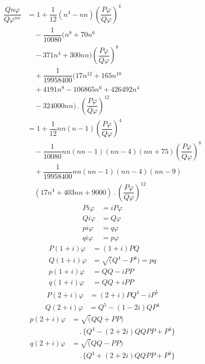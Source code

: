 \[
\begin{aligned}
\dfrac{Qn\varphi}{Q\varphi^{nn}}
&=1+\dfrac1{12}(n^4-nn)\left(\dfrac{P\varphi}{Q\varphi}\right)^4
\\[5pt]&\quad{}-\dfrac1{10080}(n^8+70n^6\\[5pt]&\quad{}-371n^4+300nn)\left(\dfrac{P\varphi}{Q\varphi}\right)^8\\[7pt]
&\quad+\dfrac1{19958400}(17n^{12}+165n^{10}\\[5pt]&\quad{}+4191n^8-106865n^6+426492n^4\\[7pt]
&\quad-324000nn)\, .\,\left(\dfrac{P\varphi}{Q\varphi}\right)^{12}\\[7pt]
&=1+\dfrac1{12}nn(n-1)\left(\dfrac{P\varphi}{Q\varphi}\right)^4
\\[5pt]&\quad{}-\dfrac1{10080}nn(nn-1)(nn-4)(nn+75)\left(\dfrac{P\varphi}{Q\varphi}\right)^8\\[7pt]
&\quad+\dfrac1{19958400}nn(nn-1)(nn-4)(nn-9)\\[5pt]&\quad{}(17n^4+403nn+9000)\, .\,\left(\dfrac{P\varphi}{Q\varphi}\right)^{12}
\end{aligned}
\]
\[
\begin{aligned}
Pi\varphi&=iP\varphi\\[4pt]
Qi\varphi&=Q\varphi\\[4pt]
pi\varphi&=q\varphi\\[4pt]
qi\varphi&=p\varphi
\end{aligned}
\]
\[
\begin{aligned}
P(1+i)\varphi&=(1+i)PQ\\[4pt]
Q(1+i)\varphi&=\surd(Q^4-P^4)=pq\\[4pt]
p(1+i)\varphi&=QQ-iPP\\[4pt]
q(1+i)\varphi&=QQ+iPP
\end{aligned}
\]
\[
\begin{aligned}P(2+i)\varphi&=(2+i)PQ^4-iP^5\end{aligned}
\]
\[
\begin{aligned}Q(2+i)\varphi&=Q^5-(1-2i)QP^4\end{aligned}
\]
\[
\begin{aligned}p(2+i)\varphi&=\surd(QQ+PP)\\[5pt]&\quad{}\, .\,\{Q^4-(2+2i)QQPP+P^4\}\end{aligned}
\]
\[
\begin{aligned}q(2+i)\varphi&=\surd(QQ-PP)\\[5pt]&\quad{}\, .\,\{Q^4+(2+2i)QQPP+P^4\}\end{aligned}
\]
